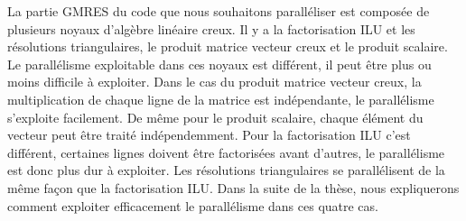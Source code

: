 La partie GMRES du code que nous souhaitons paralléliser est composée de plusieurs noyaux d'algèbre linéaire creux.
%
Il y a la factorisation ILU et les résolutions triangulaires, le produit matrice vecteur creux et le produit scalaire.
%
Le parallélisme exploitable dans ces noyaux est différent, il peut être plus ou moins difficile à exploiter.
%
Dans le cas du produit matrice vecteur creux, la multiplication de chaque ligne de la matrice est indépendante, le parallélisme s'exploite facilement.
%
De même pour le produit scalaire, chaque élément du vecteur peut être traité indépendemment.
%
Pour la factorisation ILU c'est différent, certaines lignes doivent être factorisées avant d'autres, le parallélisme est donc plus dur à exploiter.
%
Les résolutions triangulaires se parallélisent de la même façon que la factorisation ILU.
%
Dans la suite de la thèse, nous expliquerons comment exploiter efficacement le parallélisme dans ces quatre cas.

